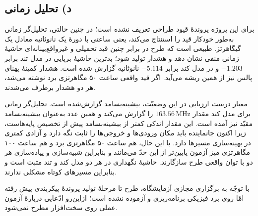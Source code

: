 \documentclass[12pt,a4paper]{article}
\begin{document}


	\subsection*{د) تحلیل زمانی}
	برای این پروژه پروندهٔ قیود طراحی تعریف نشده است؛ در چنین حالتی، تحلیل‌گر زمانی به‌طور خودکار قید  را استنتاج می‌کند، یعنی ساعتی با دورهٔ یک نانوثانیه معادل یک گیگاهرتز. طبیعی است که طرح در برابر چنین قید تحمیلی و غیرواقع‌بینانه‌ای حاشیهٔ زمانی منفی نشان دهد و هشدار  تولید شود؛ بدترین حاشیهٔ برپایی در مدل تند برابر \(-1.203\) و در مدل کند برابر \(-5.114\) نانوثانیه گزارش شده است. هشدار کمینهٔ پهنای پالس نیز از همین ریشه می‌آید. اگر قید واقعی ساعت ۵۰ مگاهرتزی برد نوشته می‌شد، هر دو هشدار برطرف می‌شدند.

	معیار درست ارزیابی در این وضعیّت، بیشینه‌بسامد گزارش‌شده است. تحلیل‌گر زمانی برای مدل کند مقدار \(163.56\,\mathrm{MHz}\) را گزارش می‌کند و همین عدد به‌عنوان بیشینه‌بسامد مقیّد نیز آمده است. این مقدار اندکی کمتر از بیشینه‌بسامد پیش از تخصیص پایه‌هاست، زیرا اکنون جانماینده باید مکان ورودی‌ها و خروجی‌ها را ثابت نگه دارد و آزادی کمتری در بهینه‌سازی مسیرها دارد. با این حال، هم ساعت ۵۰ مگاهرتزی برد و هم ساعت ۱۰۰ مگاهرتزی میز آزمون پایین‌تر از این حدّ می‌مانند و بنابراین شبیه‌سازی و پیاده‌سازی هر دو با توان واقعی طرح سازگارند. حاشیهٔ نگهداری در هر دو مدل کند و تند مثبت است و بنابراین مسیرهای کوتاه مشکلی ندارند.

	با توجّه به برگزاری مجازی آزمایشگاه، طرح تا مرحلهٔ تولید پروندهٔ پیکربندی پیش رفته امّا روی برد فیزیکی برنامه‌ریزی و آزموده نشده است؛ ازاین‌رو ادّعایی دربارهٔ آزمون عملی روی سخت‌افزار مطرح نمی‌شود.
\end{document}
